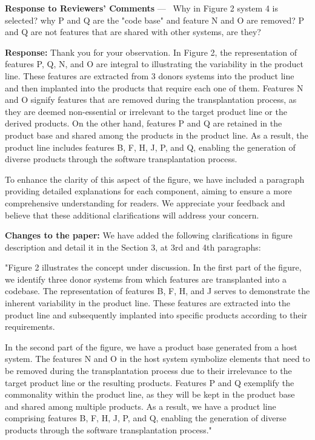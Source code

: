 \documentclass[a4paper,11pt]{letter}
\newcounter{reviewer}
\newcounter{point}[reviewer]
\renewcommand{\thepoint}{P\,\thereviewer.\arabic{point}}
\newenvironment{point}
   {\refstepcounter{point} \bigskip \noindent {\textbf{Reviewer~Point~\thepoint} } ---\ }
   {\par }
\newcommand{\response}[1]{\textbf{Response:} \begingroup\color{black}#1\endgroup}
\newcommand{\changes}[1]{\textbf{Changes to the paper:} \begingroup\color{blue}#1\endgroup}
\begin{document}
\begin{letter}{\textbf{Response to Reviewers' Comments}}
\begin{point} 
Why in Figure 2 system 4 is selected? why P and Q are the "code base" and feature N and O are removed? P and Q are not features that are shared with other systems, are they?
\end{point}

\response{Thank you for your observation. In Figure 2, the representation of features P, Q, N, and O are integral to illustrating the variability in the product line. These features are extracted from 3 donors systems into the product line and then implanted into the products that require each one of them. Features N and O signify features that are removed during the transplantation process, as they are deemed non-essential or irrelevant to the target product line or the derived products. On the other hand, features P and Q are retained in the product base and shared among the products in the product line. As a result, the product line includes features B, F, H, J, P, and Q, enabling the generation of diverse products through the software transplantation process.

To enhance the clarity of this aspect of the figure, we have included a paragraph providing detailed explanations for each component, aiming to ensure a more comprehensive understanding for readers. We appreciate your feedback and believe that these additional clarifications will address your concern.}

\changes{We have added the following clarifications in figure description and detail it in the Section 3,  at 3rd and 4th paragraphs:

"Figure 2 illustrates the concept under discussion. In the first part of the figure, we identify three donor systems from which features are transplanted into a codebase. The representation of features B, F, H, and J serves to demonstrate the inherent variability in the product line. These features are extracted into the product line and subsequently implanted into specific products according to their requirements.

In the second part of the figure, we have a product base generated from a host system. The features N and O in the host system symbolize elements that need to be removed during the transplantation process due to their irrelevance to the target product line or the resulting products. Features P and Q exemplify the commonality within the product line, as they will be kept in the product base and shared among multiple products. As a result, we have a product line comprising features B, F, H, J, P, and Q, enabling the generation of diverse products through the software transplantation process."}


\end{letter}
\end{document}
